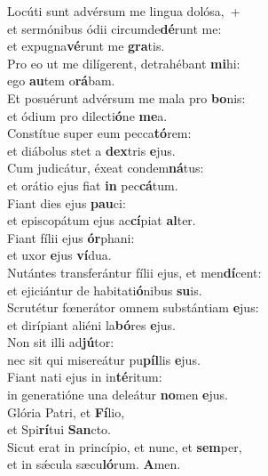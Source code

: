 \evenverse Locúti sunt advérsum me lingua dolósa,~+\\\evenverse  et sermónibus ódii circumde\textbf{dé}runt me:~\*\\
\evenverse et expugna\textbf{vé}runt me \textbf{gra}tis.\\
\oddverse Pro eo ut me dilígerent, detrahébant \textbf{mi}hi:~\*\\
\oddverse ego \textbf{au}tem o\textbf{rá}bam.\\
\evenverse Et posuérunt advérsum me mala pro \textbf{bo}nis:~\*\\
\evenverse et ódium pro dilecti\textbf{ó}ne \textbf{me}a.\\
\oddverse Constítue super eum pecca\textbf{tó}rem:~\*\\
\oddverse et diábolus stet a \textbf{dex}tris \textbf{e}jus.\\
\evenverse Cum judicátur, éxeat condem\textbf{ná}tus:~\*\\
\evenverse et orátio ejus fiat \textbf{in} pec\textbf{cá}tum.\\
\oddverse Fiant dies ejus \textbf{pau}ci:~\*\\
\oddverse et episcopátum ejus ac\textbf{cí}piat \textbf{al}ter.\\
\evenverse Fiant fílii ejus \textbf{ór}phani:~\*\\
\evenverse et uxor \textbf{e}jus \textbf{ví}dua.\\
\oddverse Nutántes transferántur fílii ejus, et men\textbf{dí}cent:~\*\\
\oddverse et ejiciántur de habitati\textbf{ó}nibus \textbf{su}is.\\
\evenverse Scrutétur fœnerátor omnem substántiam \textbf{e}jus:~\*\\
\evenverse et dirípiant aliéni la\textbf{bó}res \textbf{e}jus.\\
\oddverse Non sit illi ad\textbf{jú}tor:~\*\\
\oddverse nec sit qui misereátur pu\textbf{píl}lis \textbf{e}jus.\\
\evenverse Fiant nati ejus in in\textbf{té}ritum:~\*\\
\evenverse in generatióne una deleátur \textbf{no}men \textbf{e}jus.\\
\oddverse Glória Patri, et \textbf{Fí}lio,~\*\\
\oddverse et Spi\textbf{rí}tui \textbf{San}cto.\\
\evenverse Sicut erat in princípio, et nunc, et \textbf{sem}per,~\*\\
\evenverse et in sǽcula sæcu\textbf{ló}rum. \textbf{A}men.\\
